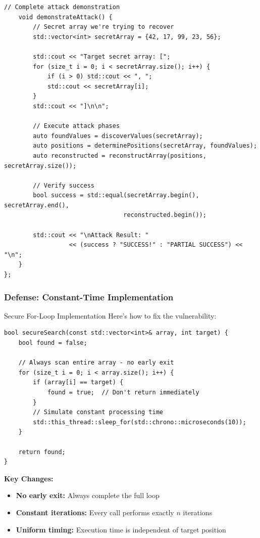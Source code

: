 \documentclass[12pt,a4paper]{article}
\theoremstyle{definition}
\begin{document}
\begin{lstlisting}[style=cryptoCode, caption={Complete Attack Implementation}]
    // Complete attack demonstration
    void demonstrateAttack() {
        // Secret array we're trying to recover
        std::vector<int> secretArray = {42, 17, 99, 23, 56};
        
        std::cout << "Target secret array: [";
        for (size_t i = 0; i < secretArray.size(); i++) {
            if (i > 0) std::cout << ", ";
            std::cout << secretArray[i];
        }
        std::cout << "]\n\n";
        
        // Execute attack phases
        auto foundValues = discoverValues(secretArray);
        auto positions = determinePositions(secretArray, foundValues);
        auto reconstructed = reconstructArray(positions, secretArray.size());
        
        // Verify success
        bool success = std::equal(secretArray.begin(), secretArray.end(),
                                 reconstructed.begin());
        
        std::cout << "\nAttack Result: " 
                  << (success ? "SUCCESS!" : "PARTIAL SUCCESS") << "\n";
    }
};
\end{lstlisting}

\subsubsection{Defense: Constant-Time Implementation}

\begin{examplebox}{Secure For-Loop Implementation}
Here's how to fix the vulnerability:

\begin{lstlisting}[style=cryptoCode, caption={Constant-Time Array Search}]
bool secureSearch(const std::vector<int>& array, int target) {
    bool found = false;
    
    // Always scan entire array - no early exit
    for (size_t i = 0; i < array.size(); i++) {
        if (array[i] == target) {
            found = true;  // Don't return immediately
        }
        // Simulate constant processing time
        std::this_thread::sleep_for(std::chrono::microseconds(10));
    }
    
    return found;
}
\end{lstlisting}

\textbf{Key Changes:}
\begin{itemize}
    \item \textbf{No early exit:} Always complete the full loop
    \item \textbf{Constant iterations:} Every call performs exactly $n$ iterations
    \item \textbf{Uniform timing:} Execution time is independent of target position
\end{itemize}
\end{examplebox}
\end{document}
